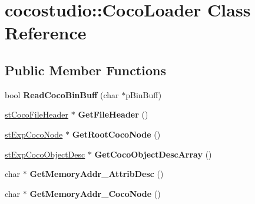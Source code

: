 \hypertarget{classcocostudio_1_1CocoLoader}{}\section{cocostudio\+:\+:Coco\+Loader Class Reference}
\label{classcocostudio_1_1CocoLoader}
\subsection*{Public Member Functions}
\begin{DoxyCompactItemize}
\item 
\mbox{\label{classcocostudio_1_1CocoLoader_ad92550131fd05eaac59d586098ab6aaa}} 
bool {\bfseries Read\+Coco\+Bin\+Buff} (char $\ast$p\+Bin\+Buff)
\item 
\mbox{\label{classcocostudio_1_1CocoLoader_a2243df1d3d0002e81a99f39ebe04f936}} 
\hyperlink{structcocostudio_1_1stCocoFileHeader}{st\+Coco\+File\+Header} $\ast$ {\bfseries Get\+File\+Header} ()
\item 
\mbox{\label{classcocostudio_1_1CocoLoader_acde720ca8fd51b6f2454cbcacdc81e40}} 
\hyperlink{structcocostudio_1_1stExpCocoNode}{st\+Exp\+Coco\+Node} $\ast$ {\bfseries Get\+Root\+Coco\+Node} ()
\item 
\mbox{\label{classcocostudio_1_1CocoLoader_a5c330fcc5f38981dc07a6a8ee1bc87cd}} 
\hyperlink{structcocostudio_1_1stExpCocoObjectDesc}{st\+Exp\+Coco\+Object\+Desc} $\ast$ {\bfseries Get\+Coco\+Object\+Desc\+Array} ()
\item 
\mbox{\label{classcocostudio_1_1CocoLoader_a589dc920398cbb4d8c1a4c846666e758}} 
char $\ast$ {\bfseries Get\+Memory\+Addr\+\_\+\+Attrib\+Desc} ()
\item 
\mbox{\label{classcocostudio_1_1CocoLoader_ae4a05c6c5bc5fc185657df7f5daebfba}} 
char $\ast$ {\bfseries Get\+Memory\+Addr\+\_\+\+Coco\+Node} ()
\item 
\mbox{\label{classcocostudio_1_1CocoLoader_a959f17b9bc82ccaaaf831fb661c8c486}} 

\end{DoxyCompactItemize}
